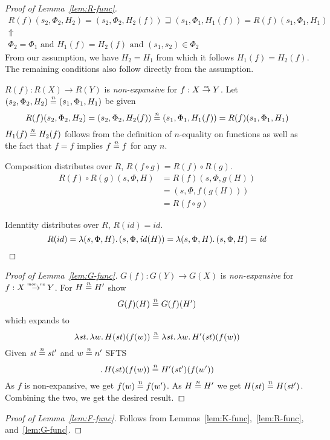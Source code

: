 \documentclass{article}
\newcommand{\monnefun}{\stackrel{\textit{\tiny{mon, ne}}}{\rightarrow}}
\newcommand{\nefun}{\stackrel{\textit{\tiny{ne}}}{\rightarrow}}
\newcommand{\nequal}[1][n]{\stackrel{\tiny{#1}}{=}}
\newcommand{\id}{\var{id}}
\newcommand{\var}[1]{\mathit{#1}}
\newcommand{\future}{\mathbin{\sqsupseteq}}
\begin{document}
\begin{appendices}
\begin{proof}[Proof of Lemma~\ref{lem:R-func}]
    \begin{gather*}
      R(f)(s_2,\Phi_2,H_2) = (s_2,\Phi_2,H_2(f)) \future (s_1,\Phi_1,H_1(f)) = R(f)(s_1,\Phi_1,H_1) \\
      \Uparrow\\
      \Phi_2 = \Phi_1 \text{ and } H_1(f) = H_2(f) \text{ and } (s_1,s_2) \in \Phi_2
    \end{gather*}
    From our assumption, we have $H_2 = H_1$ from which it follows $H_1(f) = H_2(f)$. The remaining conditions also follow directly from the assumption.

    $R(f) : R(X) \rightarrow R(Y)$ is \emph{non-expansive} for $f : X \nefun Y$. Let $(s_2,\Phi_2,H_2) \nequal (s_1,\Phi_1,H_1)$ be given
\[
  R(f)(s_2,\Phi_2,H_2) = (s_2,\Phi_2,H_2(f)) \nequal (s_1,\Phi_1,H_1(f)) = R(f)(s_1,\Phi_1,H_1)
\]
$H_1(f) \nequal H_2(f)$ follows from the definition of $n$-equality on functions as well as the fact that $f=f$ implies $f \nequal f$ for any $n$.

  Composition distributes over $R$, $R(f \circ g) = R(f) \circ R(g)$.
  \begin{align*}
    R(f) \circ R(g)(s,\Phi,H) &= R(f)(s,\Phi,g(H)) \\
                              &= (s,\Phi,f(g(H)))\\
                              &= R(f \circ g)
  \end{align*}

  Idenntity distributes over $R$, $R(\id) = \id$.
  \[
    R(id) = \lambda (s,\Phi,H) \ldotp  (s,\Phi,\id(H)) = \lambda (s,\Phi,H) \ldotp  (s,\Phi,H) = \id
  \]
\end{proof}

\begin{proof}[Proof of Lemma~\ref{lem:G-func}]
  $G(f) : G(Y) \rightarrow G(X)$ is \emph{non-expansive} for $f : X \monnefun Y$. For $H \nequal H'$ show
  \[
    G(f)(H) \nequal G(f)(H')
  \]
  which expands to
  \[
    \lambda \var{st} \ldotp \lambda w \ldotp H(\var{st})(f(w)) \nequal \lambda \var{st} \ldotp \lambda w \ldotp  H'(\var{st})(f(w))
  \]
  Given $\var{st} \nequal \var{st}'$ and $w \nequal n'$ SFTS
  \[
  \ldotp H(\var{st})(f(w)) \nequal H'(\var{st}')(f(w'))
  \]
  As $f$ is non-expansive, we get $f(w) \nequal f(w')$. As $H \nequal H'$ we get $H(\var{st}) \nequal H(\var{st'})$. Combining the two, we get the desired result.  
\end{proof}

\begin{proof}[Proof of Lemma~\ref{lem:F-func}]
Follows from Lemmas~\ref{lem:K-func},~\ref{lem:R-func}, and~\ref{lem:G-func}.
\end{proof}


\end{appendices}
\end{document}
